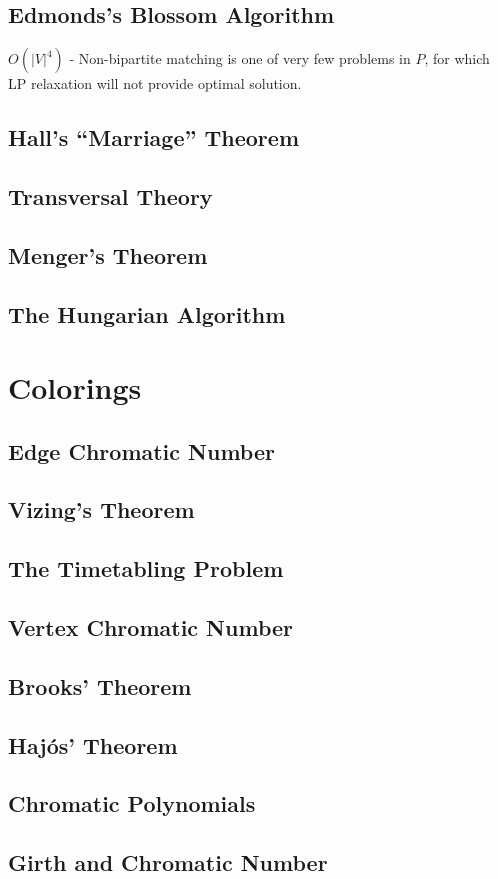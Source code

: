		\section{Edmonds's Blossom Algorithm}

		
			$O(|V|^4)$
			- Non-bipartite matching is one of very few problems in $P$, for which LP relaxation will not provide optimal solution.

		\section{Hall's ``Marriage'' Theorem}

		\section{Transversal Theory}

		\section{Menger's Theorem}

		\section{The Hungarian Algorithm}

	\chapter{Colorings}
		\section{Edge Chromatic Number}

		\section{Vizing's Theorem}

		\section{The Timetabling Problem}

		\section{Vertex Chromatic Number}

		\section{Brooks' Theorem}

		\section{Haj\'{o}s' Theorem}

		\section{Chromatic Polynomials}

		\section{Girth and Chromatic Number}


